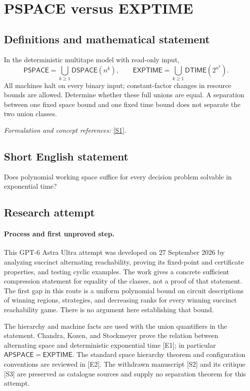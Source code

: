 \documentclass[11pt]{article}
\begin{document}
\section*{\texorpdfstring{PSPACE versus EXPTIME}{PSPACE versus EXPTIME}}\label{90}
\subsection{Definitions and mathematical statement}
In the deterministic multitape model with read-only input,
\[
 \mathsf{PSPACE}=\bigcup_{k\ge1}\mathsf{DSPACE}(n^k),\qquad
 \mathsf{EXPTIME}=\bigcup_{k\ge1}\mathsf{DTIME}(2^{n^k}).
\]
All machines halt on every binary input; constant-factor changes in resource bounds are allowed. Determine whether these full unions are equal. A separation between one fixed space bound and one fixed time bound does not separate the two union classes.
\par\smallskip\textit{Formulation and concept references:} \href{https://art.torvergata.it/bitstream/2108/32769/60437/ComputabilityDecidabilityComplexity.pdf}{[S1]}.

\subsection{Short English statement}
Does polynomial working space suffice for every decision problem solvable in exponential time?
\subsection{Research attempt}
\paragraph{Process and first unproved step.}
This GPT-6 Astra Ultra attempt was developed on 27 September 2026 by analyzing succinct alternating reachability, proving its fixed-point and certificate properties, and testing cyclic examples. The work gives a concrete sufficient compression statement for equality of the classes, not a proof of that statement. The first gap in this route is a uniform polynomial bound on circuit descriptions of winning regions, strategies, and decreasing ranks for every winning succinct reachability game. There is no argument here establishing that bound.

The hierarchy and machine facts are used with the union quantifiers in the statement. Chandra, Kozen, and Stockmeyer prove the relation between alternating space and deterministic exponential time [E1]; in particular $\mathsf{APSPACE}=\mathsf{EXPTIME}$. The standard space hierarchy theorem and configuration conventions are reviewed in [E2]. The withdrawn manuscript [S2] and its critique [S3] are preserved as catalogue sources and supply no separation theorem for this attempt.
\end{document}
